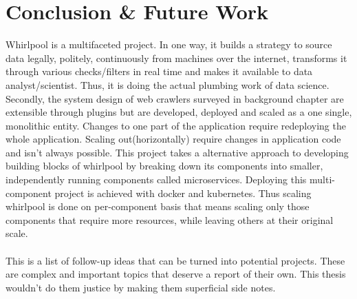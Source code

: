 \chapter{Conclusion \& Future Work}
Whirlpool is a multifaceted project. In one way, it builds a strategy to source data legally, politely, continuously from machines over the internet, transforms it through various checks/filters in real time and makes it available to data analyst/scientist. Thus, it is doing the actual plumbing work of data science. Secondly, the system design of web crawlers surveyed in background chapter are extensible through plugins but are developed, deployed and scaled as a one single, monolithic entity. Changes to one part of the application require redeploying the whole application. Scaling out(horizontally) require changes in application code and isn't always possible. This project takes a alternative approach to developing building blocks of whirlpool by breaking down its components into smaller, independently running components called microservices. Deploying this multi-component project is achieved with docker and kubernetes. Thus scaling whirlpool is done on per-component basis that means scaling only those components that require more resources, while leaving others at their original scale.
\\
\\
\noindent
This is a list of follow-up ideas that can be turned into potential projects. These are complex and
important topics that deserve a report of their own. This thesis wouldn't do them justice by making
them superficial side notes.

